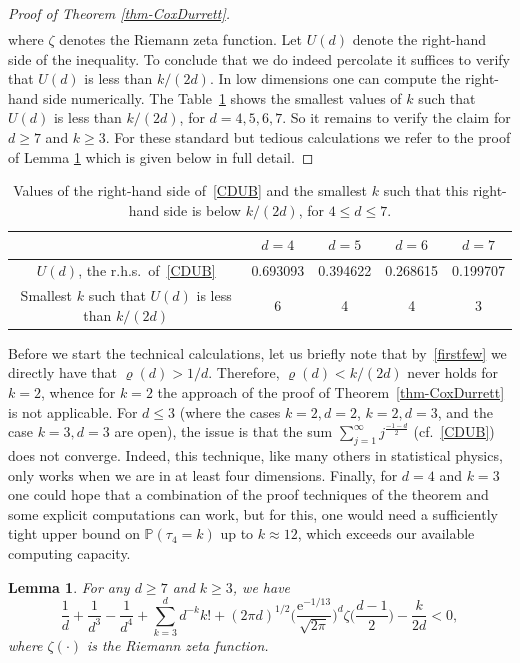 \documentclass[a4paper, oneside, 11pt]{amsart}
\newcommand{\e}{\mathrm e}
\newtheorem{lemma}[theorem]{Lemma}
\theoremstyle{definition}
\renewcommand{\P}{\mathbb{P}}
\newcommand{\1}{\mathbbm{1}}
\newcommand{\0}{\mathbf{o}}
\numberwithin{equation}{section}
\begin{document}
\begin{proof}[Proof of Theorem \ref{thm-CoxDurrett}]
\begin{equation}
\begin{aligned}
\end{aligned}\end{equation}
where $\zeta$ denotes the Riemann zeta function. Let $U(d)$ denote the right-hand side of the inequality. To conclude that we do indeed percolate it suffices to verify that $U(d)$ is less than $k/(2d)$. In low dimensions one can compute the right-hand side numerically. 
The Table~\ref{table-CD} shows the smallest values of $k$ such that $U(d)$ is less than $k/(2d)$, for $d=4,5,6,7$.
So it remains to verify the claim for $d \geq 7$ and $k\geq 3$. For these standard but tedious calculations we refer to the proof of Lemma \ref{lemma-largedmon} which is given below in full detail. 
\end{proof}
\begin{table}[hb]
\begin{center}
    \begin{tabular}{|c|c|c|c|c|} \hline
       &  $d=4$ & $d=5$ & $d=6$ & $d=7$ \\ \hline
        $U(d)$, the r.h.s.\ of~\eqref{CDUB}   & 0.693093  & 0.394622  & 0.268615 & 0.199707  \\ \hline
         Smallest $k$ such that $U(d)$ is less than $k/(2d) $ & 6 & 4 & 4 & 3 \\ \hline 
    \end{tabular}
\end{center}
\caption{Values of the right-hand side of~\eqref{CDUB} and the smallest $k$ such that this right-hand side is below $k/(2d) $, for $4 \leq d \leq 7$.}\label{table-CD}
\end{table}

Before we start the technical calculations, let us briefly note that by~\eqref{firstfew} we directly have that $\varrho(d) >1/d$. Therefore, $\varrho(d)<k/(2d)$ never holds for $k=2$, whence for $k=2$ the approach of the proof of Theorem~\ref{thm-CoxDurrett} is not applicable. 
For $d\leq 3$ (where the cases $k=2,d=2$, $k=2,d=3$, and the case $k=3,d=3$ are open), the issue is that the sum $\sum_{j=1}^{\infty} j^{\frac{-1-d}{2}}$ (cf.\ \eqref{CDUB}) does not converge. 
Indeed, this technique, like many others in statistical physics, only works when we are in at least four dimensions.
Finally, for $d=4$ and $k=3$ one could hope that a combination of the proof techniques of the theorem and some explicit computations can work, but for this, one would need a sufficiently tight upper bound on $\P(\tau_4 = k)$ up to $k \approx 12$, which exceeds our available computing capacity. 

\begin{lemma}\label{lemma-largedmon}
For any $d \geq 7$ and $k \geq 3$, we have
\begin{equation}\label{largedmon} \frac{1}{d} + \frac{1}{d^3} -\frac{1}{d^4} + \sum_{k=3}^d d^{-k} k! +  (2\pi d)^{1/2} \Big( \frac{\e^{-1/13}}{\sqrt{2\pi}} \Big)^d \zeta\Big( \frac{d-1}{2} \Big) - \frac{k}{2d} < 0,  
\end{equation}
where $\zeta(\cdot)$ is the Riemann zeta function. 
\end{lemma}
\end{document}
